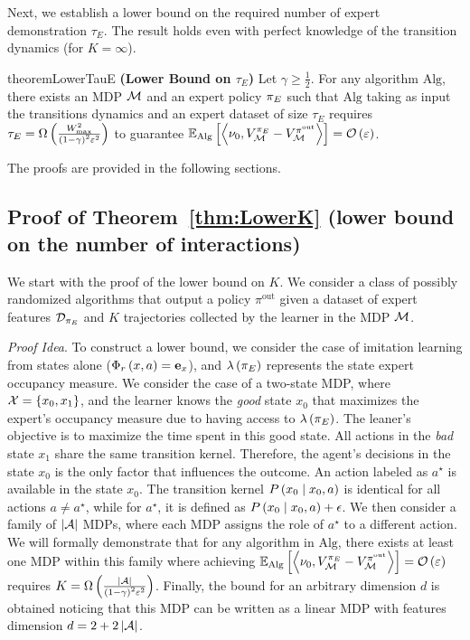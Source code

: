 \noindent Next, we establish a lower bound on the required number of expert demonstration $\tau_E$. The result holds even with perfect knowledge of the transition dynamics (\ie for $K = \infty$).
%
\begin{restatable}{theorem}{LowerTauE} \textbf{(Lower Bound on $\tau_E$)} \label{thm:LowerTauE} \label{thm:lower-bound-2states_expert}
    Let $\gamma \geq \frac12$. For any algorithm $\mathrm{Alg}$, there exists an MDP $\mathcal{M}$ and an expert policy ${\pi_E}$ such that $\mathrm{Alg}$ taking as input the transitions dynamics and an expert dataset of size $\tau_E$ requires $\tau_E = \Omega \left( \frac{W_{\max}^2}{\left( 1 - \gamma \right)^2 \varepsilon^2} \right)$ to guarantee $\mathbb{E}_{\mathrm{Alg}} \left[ \left\langle \nu_0, V_{\mathcal{M}}^{{\pi_E}} - V_{\mathcal{M}}^{\pi^{\mathrm{out}}} \right\rangle \right] = \mathcal{O} \left( \varepsilon \right)$.
\end{restatable}
%
\noindent The proofs are provided in the following sections.


\subsection{Proof of Theorem~\ref{thm:LowerK} (lower bound on the number of interactions)}

We start with the proof of the lower bound on $K$. We consider a class of possibly randomized algorithms that output a policy $\pi^{\mathrm{out}}$ given a dataset of expert features $\mathcal{D}_{\pi_E}$ and $K$ trajectories collected by the learner in the MDP $\mathcal{M}$.

\noindent \emph{Proof Idea}. To construct a lower bound, we consider the case of imitation learning from states alone (\ie $\Phi_r \left( x, a \right) = \mathbf{e}_x$), and $\lambda \left( {\pi_E} \right)$ represents the state expert occupancy measure. We consider the case of a two-state MDP, where $\mathcal{X} = \left\{ x_0, x_1 \right\}$, and the learner knows the \emph{good} state $x_0$ that maximizes the expert's occupancy measure due to having access to $\lambda \left( {\pi_E} \right)$. The leaner's objective is to maximize the time spent in this good state. All actions in the \emph{bad} state $x_1$ share the same transition kernel. Therefore, the agent's decisions in the state $x_0$ is the only factor that influences the outcome. An action labeled as $a^\star$ is available in the state $x_0$. The transition kernel $P\left( x_0 \mathrel{}\middle|\mathrel{} x_0, a \right)$ is identical for all actions $a \neq a^\star$, while for $a^\star$, it is defined as $P \left( x_0 \mathrel{}\middle|\mathrel{} x_0, a \right) + \epsilon$. We then consider a family of $\left|\mathcal{A}\right|$ MDPs, where each MDP assigns the role of $a^\star$ to a different action. We will formally demonstrate that for any algorithm in $\mathrm{Alg}$, there exists at least one MDP within this family where achieving $\mathbb{E}_{\mathrm{Alg}} \left[ \left\langle \nu_0, V_{\mathcal{M}}^{{\pi_E}} - V_{\mathcal{M}}^{\pi^{\mathrm{out}}} \right\rangle \right] = \mathcal{O} \left( \varepsilon \right)$ requires $K = \Omega \left( \frac{\left|\mathcal{A}\right|}{\left( 1 - \gamma \right)^2 \varepsilon^2} \right)$. Finally, the bound for an arbitrary dimension $d$ is obtained noticing that this MDP can be written as a linear MDP with features dimension $d = 2 + 2 \left|\mathcal{A}\right|$.


